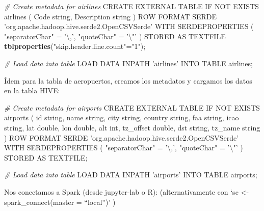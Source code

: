 \documentclass[]{book}
\newenvironment{Shaded}{\begin{snugshade}}{\end{snugshade}}
\newcommand{\KeywordTok}[1]{\textcolor[rgb]{0.13,0.29,0.53}{\textbf{#1}}}
\newcommand{\CharTok}[1]{\textcolor[rgb]{0.31,0.60,0.02}{#1}}
\newcommand{\StringTok}[1]{\textcolor[rgb]{0.31,0.60,0.02}{#1}}
\newcommand{\CommentTok}[1]{\textcolor[rgb]{0.56,0.35,0.01}{\textit{#1}}}
\newcommand{\NormalTok}[1]{#1}
\begin{document}
\begin{Shaded}
\begin{Highlighting}[]
\CommentTok{# Create metadata for airlines}
\NormalTok{CREATE EXTERNAL TABLE IF NOT EXISTS airlines}
\NormalTok{(}
\NormalTok{Code string,}
\NormalTok{Description string}
\NormalTok{)}
\NormalTok{ROW FORMAT SERDE }\StringTok{'org.apache.hadoop.hive.serde2.OpenCSVSerde'}
\NormalTok{WITH SERDEPROPERTIES}
\NormalTok{(}
\StringTok{"separatorChar"}\NormalTok{ =}\StringTok{ '\textbackslash{},'}\NormalTok{,}
\StringTok{"quoteChar"}\NormalTok{     =}\StringTok{ '}\CharTok{\textbackslash{}"}\StringTok{'}
\NormalTok{)}
\NormalTok{STORED AS TEXTFILE}
\KeywordTok{tblproperties}\NormalTok{(}\StringTok{"skip.header.line.count"}\NormalTok{=}\StringTok{"1"}\NormalTok{);}

\CommentTok{# Load data into table}
\NormalTok{LOAD DATA INPATH }\StringTok{'airlines'}\NormalTok{ INTO TABLE airlines;}
\end{Highlighting}
\end{Shaded}

Ídem para la tabla de aeropuertos, creamos los metadatos y cargamos los
datos en la tabla HIVE:

\begin{Shaded}
\begin{Highlighting}[]
\CommentTok{# Create metadata for airports}
\NormalTok{CREATE EXTERNAL TABLE IF NOT EXISTS airports}
\NormalTok{(}
\NormalTok{id string,}
\NormalTok{name string,}
\NormalTok{city string,}
\NormalTok{country string,}
\NormalTok{faa string,}
\NormalTok{icao string,}
\NormalTok{lat double,}
\NormalTok{lon double,}
\NormalTok{alt int,}
\NormalTok{tz_offset double,}
\NormalTok{dst string,}
\NormalTok{tz_name string}
\NormalTok{)}
\NormalTok{ROW FORMAT SERDE }\StringTok{'org.apache.hadoop.hive.serde2.OpenCSVSerde'}
\NormalTok{WITH SERDEPROPERTIES}
\NormalTok{(}
\StringTok{"separatorChar"}\NormalTok{ =}\StringTok{ '\textbackslash{},'}\NormalTok{,}
\StringTok{"quoteChar"}\NormalTok{     =}\StringTok{ '}\CharTok{\textbackslash{}"}\StringTok{'}
\NormalTok{)}
\NormalTok{STORED AS TEXTFILE;}

\CommentTok{# Load data into table}
\NormalTok{LOAD DATA INPATH }\StringTok{'airports'}\NormalTok{ INTO TABLE airports;}
\end{Highlighting}
\end{Shaded}

Nos conectamos a Spark (desde jupyter-lab o R): (alternativamente con
`sc \textless{}- spark\_connect(master = ``local'')' )
\end{document}
